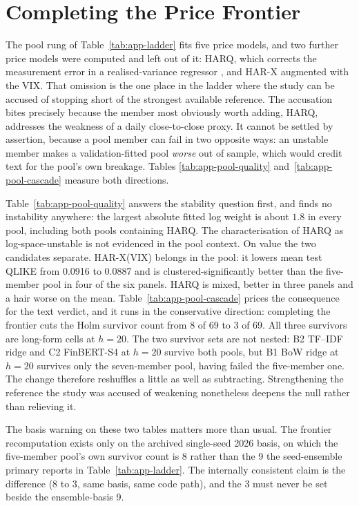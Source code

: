 \clearpage

\FloatBarrier
\section{Completing the Price Frontier}
\label{app:res-frontier}

The pool rung of Table~\ref{tab:app-ladder} fits five price models, and two
further price models were computed and left out of it: HARQ, which corrects
the measurement error in a realised-variance regressor
\cite{bollerslev2016harq}, and HAR-X augmented with the VIX. That omission
is the one place in the ladder where the study can be accused of stopping
short of the strongest available reference. The accusation bites
precisely because the member most obviously worth adding, HARQ,
addresses the weakness of a daily close-to-close proxy. It cannot be
settled by assertion, because a pool member can fail in two opposite ways:
an unstable member makes a validation-fitted pool \emph{worse} out of
sample, which would credit text for the pool's own breakage. Tables
\ref{tab:app-pool-quality} and~\ref{tab:app-pool-cascade} measure both
directions.

Table~\ref{tab:app-pool-quality} answers the stability question first, and
finds no instability anywhere: the largest absolute fitted log weight is
about $1.8$ in every pool, including both pools containing HARQ. The
characterisation of HARQ as log-space-unstable is not evidenced in the pool
context. On value the two candidates separate. HAR-X(VIX) belongs in the
pool: it lowers mean test QLIKE from 0.0916 to 0.0887 and is
clustered-significantly better than the five-member pool in four of the six
panels. HARQ is mixed, better in three panels and a hair worse on
the mean. Table~\ref{tab:app-pool-cascade} prices the consequence for the
text verdict, and it runs in the conservative direction: completing the
frontier cuts the Holm survivor count from 8 of 69 to 3 of 69. All
three survivors are long-form cells at $h{=}20$. The two survivor sets are
not nested: B2 TF--IDF ridge and C2 FinBERT-S4 at $h{=}20$ survive both
pools, but B1 BoW ridge at $h{=}20$ survives only the seven-member pool,
having failed the five-member one. The change therefore reshuffles a little as
well as subtracting. Strengthening the reference the study was accused of
weakening nonetheless deepens the null rather than relieving it.

The basis warning on these two tables matters more than usual. The frontier
recomputation exists only on the archived single-seed 2026 basis, on which
the five-member pool's own survivor count is 8 rather than the 9 the
seed-ensemble primary reports in Table~\ref{tab:app-ladder}. The internally
consistent claim is the difference (8 to 3, same basis, same code path),
and the 3 must never be set beside the ensemble-basis 9.

